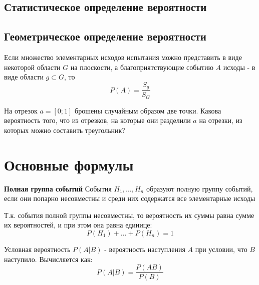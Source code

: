     \subsection{Статистическое определение вероятности}


    \subsection{Геометрическое определение вероятности}
    \begin{opr}
        Если множество элементарных исходов испытания можно представить 
        в виде некоторой области \(G\) на плоскости, а благоприятствующие
        событию \(A\) исходы - в виде области \(g\subset G\), то
        \begin{equation}
            P(A) = \frac{S_{g}}{S_{G}}
        \end{equation}
        \begin{ex}
            На отрезок \(a = [0; 1]\) брошены случайным образом две точки. 
            Какова вероятность того, что из отрезков, на которые они разделили \(a\)
            на отрезки, из которых можно составить треугольник?
        \end{ex}
    \end{opr}


    \section{Основные формулы}
    \begin{opr}
        \textbf{Полная группа событий}
        События \(H_{1}, \dots , H_{n}\) образуют полную группу событий, 
        если они попарно несовместны и среди них содержатся все элементарные исходы

        \begin{remark}
            Т.к. события полной группы несовместны, то вероятность их суммы равна 
            сумме их вероятностей, и при этом она равна единице:
            \begin{equation}
                P(H_{1}) + \dots + P(H_{n}) = 1
            \end{equation}
        \end{remark}
    \end{opr}


    \begin{opr}
        Условная вероятность \(P(A|B)\) - вероятность наступления \(A\) при условии, 
        что \(B\) наступило. Вычисляется как:
        \begin{equation}
            P(A|B) = \frac{P(AB)}{P(B)}
        \end{equation}
    \end{opr}


